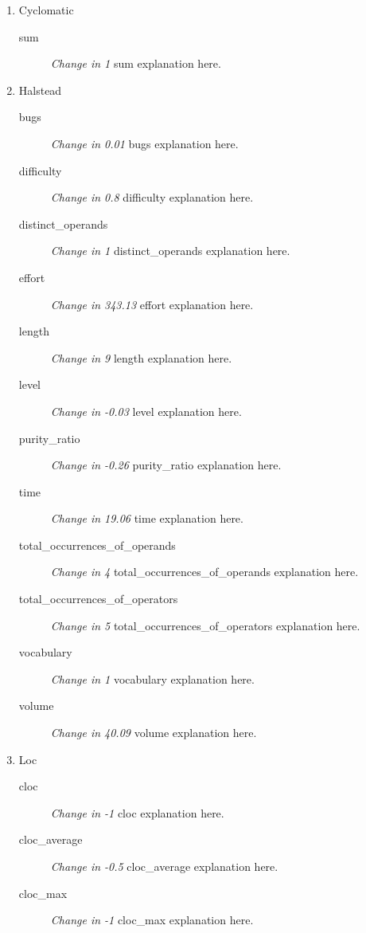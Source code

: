 \begin{enumerate}
      \item Cyclomatic
            \begin{description}
                  \item [sum] \textit{Change in 1} sum explanation here.
            \end{description}
      \item Halstead
            \begin{description}
                  \item [bugs] \textit{Change in 0.01} bugs explanation here.
                  \item [difficulty] \textit{Change in 0.8} difficulty explanation here.
                  \item [distinct\_operands] \textit{Change in 1} distinct\_operands explanation here.
                  \item [effort] \textit{Change in 343.13} effort explanation here.
                  \item [length] \textit{Change in 9} length explanation here.
                  \item [level] \textit{Change in -0.03} level explanation here.
                  \item [purity\_ratio] \textit{Change in -0.26} purity\_ratio explanation here.
                  \item [time] \textit{Change in 19.06} time explanation here.
                  \item [total\_occurrences\_of\_operands] \textit{Change in 4} total\_occurrences\_of\_operands explanation here.
                  \item [total\_occurrences\_of\_operators] \textit{Change in 5} total\_occurrences\_of\_operators explanation here.
                  \item [vocabulary] \textit{Change in 1} vocabulary explanation here.
                  \item [volume] \textit{Change in 40.09} volume explanation here.
            \end{description}
      \item Loc
            \begin{description}
                  \item [cloc] \textit{Change in -1} cloc explanation here.
                  \item [cloc\_average] \textit{Change in -0.5} cloc\_average explanation here.
                  \item [cloc\_max] \textit{Change in -1} cloc\_max explanation here.

\end{description}
\end{enumerate}
